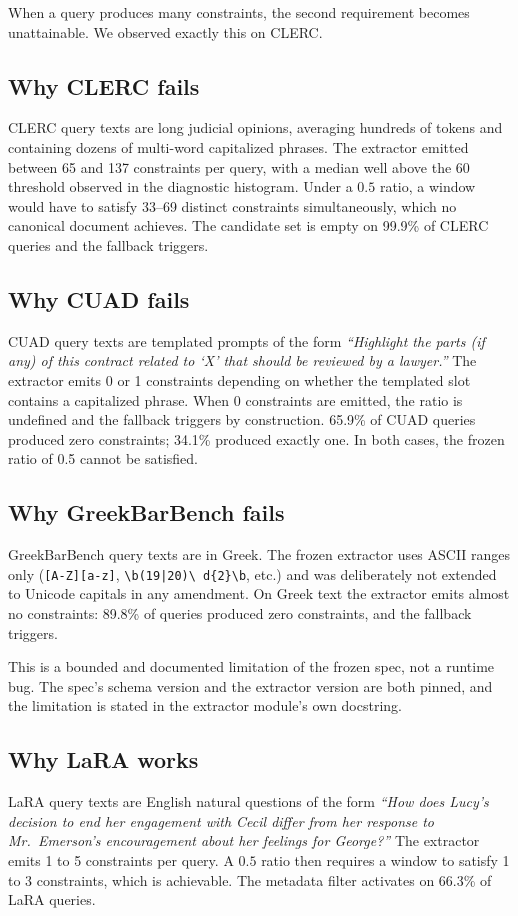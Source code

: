\documentclass[11pt,a4paper]{article}
\begin{document}
When a query produces many constraints, the second requirement
becomes unattainable. We observed exactly this on CLERC.

\subsection{Why CLERC fails}
CLERC query texts are long judicial opinions, averaging hundreds of
tokens and containing dozens of multi-word capitalized phrases. The
extractor emitted between \num{65} and \num{137} constraints per
query, with a median well above the $60$ threshold observed in the
diagnostic histogram. Under a $\num{0.5}$ ratio, a window would have
to satisfy \num{33}--\num{69} distinct constraints simultaneously,
which no canonical document achieves. The candidate set is empty on
\num{99.9}\% of CLERC queries and the fallback triggers.

\subsection{Why CUAD fails}
CUAD query texts are templated prompts of the form
\emph{``Highlight the parts (if any) of this contract related to
`X' that should be reviewed by a lawyer.''} The extractor emits
\num{0} or \num{1} constraints depending on whether the templated
slot contains a capitalized phrase. When \num{0} constraints are
emitted, the ratio is undefined and the fallback triggers by
construction. \num{65.9}\% of CUAD queries produced zero
constraints; \num{34.1}\% produced exactly one. In both cases, the
frozen ratio of \num{0.5} cannot be satisfied.

\subsection{Why GreekBarBench fails}
GreekBarBench query texts are in Greek. The frozen extractor uses
ASCII ranges only
(\texttt{[A-Z][a-z]}, \texttt{\textbackslash b(19|20)\textbackslash
d\{2\}\textbackslash b}, etc.) and was deliberately not extended to
Unicode capitals in any amendment. On Greek text the extractor emits
almost no constraints: \num{89.8}\% of queries produced zero
constraints, and the fallback triggers.

This is a bounded and documented limitation of the frozen spec,
not a runtime bug. The spec's schema version and the extractor
version are both pinned, and the limitation is stated in the
extractor module's own docstring.

\subsection{Why LaRA works}
LaRA query texts are English natural questions of the form
\emph{``How does Lucy's decision to end her engagement with Cecil
differ from her response to Mr.\ Emerson's encouragement about her
feelings for George?''} The extractor emits \num{1} to \num{5}
constraints per query. A $\num{0.5}$ ratio then requires a window to
satisfy \num{1} to \num{3} constraints, which is achievable. The
metadata filter activates on \num{66.3}\% of LaRA queries.
\end{document}
